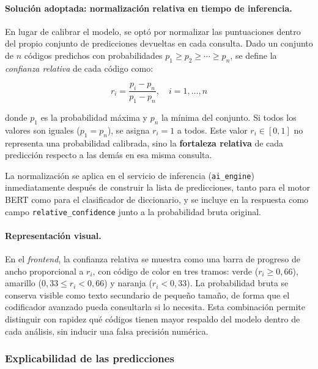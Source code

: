 \paragraph{Solución adoptada: normalización relativa en tiempo de inferencia.}
En lugar de calibrar el modelo, se optó por normalizar las puntuaciones dentro del propio conjunto de predicciones devueltas en cada consulta. Dado un conjunto de $n$ códigos predichos con probabilidades $p_1 \geq p_2 \geq \cdots \geq p_n$, se define la \emph{confianza relativa} de cada código como:

\begin{equation}
 r_i = \frac{p_i - p_n}{p_1 - p_n}, \quad i = 1, \ldots, n
\end{equation}

donde $p_1$ es la probabilidad máxima y $p_n$ la mínima del conjunto. Si todos los valores son iguales ($p_1 = p_n$), se asigna $r_i = 1$ a todos. Este valor $r_i \in [0, 1]$ no representa una probabilidad calibrada, sino la \textbf{fortaleza relativa} de cada predicción respecto a las demás en esa misma consulta.

La normalización se aplica en el servicio de inferencia (\texttt{ai\_engine}) inmediatamente después de construir la lista de predicciones, tanto para el motor BERT como para el clasificador de diccionario, y se incluye en la respuesta como campo \texttt{relative\_confidence} junto a la probabilidad bruta original.

\paragraph{Representación visual.}
En el \emph{frontend}, la confianza relativa se muestra como una barra de progreso de ancho proporcional a $r_i$, con código de color en tres tramos: verde ($r_i \geq 0{,}66$), amarillo ($0{,}33 \leq r_i < 0{,}66$) y naranja ($r_i < 0{,}33$). La probabilidad bruta se conserva visible como texto secundario de pequeño tamaño, de forma que el codificador avanzado pueda consultarla si lo necesita. Esta combinación permite distinguir con rapidez qué códigos tienen mayor respaldo del modelo dentro de cada análisis, sin inducir una falsa precisión numérica.

\subsubsection{Explicabilidad de las predicciones}
\label{sec:explicabilidad}

